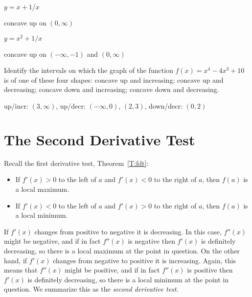 \begin{exercises}
\begin{exercise} $y = x+ 1/x$
\begin{answer} concave up on $(0,\infty)$
\end{answer}\end{exercise}

\begin{exercise} $y = x^2+ 1/x$
\begin{answer} concave up on $(-\infty,-1)$ and $(0,\infty)$
\end{answer}\end{exercise}

\endtwocol

\begin{exercise} Identify the intervals on which the graph of the
  function $f(x) = x^4-4x^3 +10$ is of one of these four shapes:
  concave up and increasing; concave up and decreasing; concave down
  and increasing; concave down and decreasing.
\begin{answer} up/incr: $(3,\infty)$, up/decr: $(-\infty,0)$, $(2,3)$,
down/decr: $(0,2)$
\end{answer}\end{exercise}


\end{exercises}








\section{The Second Derivative Test}


Recall the first derivative test, Theorem~\ref{T:fdt}:
\begin{itemize}
\item If $f'(x)>0$ to the left of $a$ and $f'(x)<0$ to the right of
  $a$, then $f(a)$ is a local maximum.
\item If $f'(x)<0$ to the left of $a$ and $f'(x)>0$ to the right of
  $a$, then $f(a)$ is a local minimum.
\end{itemize}

If $f'(x)$ changes from positive to negative it is decreasing. In this
case, $f''(x)$ might be negative, and if in fact $f''(x)$ is negative
then $f'(x)$ is definitely decreasing, so there is a local maximum at
the point in question. On the other hand, if $f'(x)$ changes from
negative to positive it is increasing. Again, this means that
$f''(x)$ might be positive, and if in fact $f''(x)$ is positive then
$f'(x)$ is definitely decreasing, so there is a local minimum at the
point in question. We summarize this as the \textit{second derivative
  test}.

